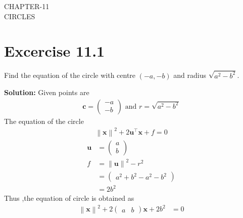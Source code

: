 \documentclass[12pt]{article}
\providecommand{\norm}[1]{\left\lVert#1\right\rVert}
\newcommand{\solution}{\noindent \textbf{Solution: }}
\newcommand{\myvec}[1]{\ensuremath{\begin{pmatrix}#1\end{pmatrix}}}
\let\vec\mathbf
\begin{document}
\begin{center}
\textbf\large{CHAPTER-11 \\ CIRCLES}

\end{center}
\section*{Excercise 11.1}

Find the equation of the circle with centre $(-a,-b)$ and radius $\sqrt{a^2-b^2}$.

\solution
Given points are
\begin{align}
	\vec{c} = \myvec{-a\\-b} \text{ and } r = \sqrt{a^2-b^2}
\end{align}
The equation of the circle 
\begin{align}
	\norm{\vec{x}}^{2} + 2\vec{u}^{\top}\vec{x} + f = 0
\end{align}
\begin{align}
	\vec{u} &= \myvec{a\\b}\\
	f &= \norm{\vec{u}}^2 - r^2\\
	  &= \myvec{a^2+b^2-a^2-b^2}\\
	  &=2b^2
\end{align}
Thus ,the equation of circle is obtained as
\begin{align}
	\norm{\vec{x}}^2 +2 \myvec{a&b}\vec{x}+2b^2 &= 0       		       
\end{align}	
\end{document}
